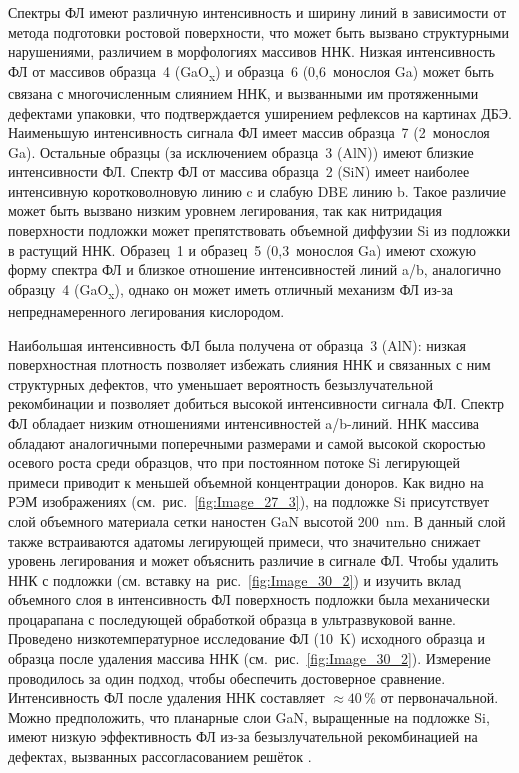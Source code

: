 Спектры ФЛ имеют различную интенсивность и ширину линий в зависимости от метода
подготовки ростовой поверхности, что может быть вызвано структурными
нарушениями, различием в морфологиях массивов ННК. Низкая интенсивность ФЛ от
массивов образца~4 (GaO\textsubscript{x}) и образца~6 (0,6~монослоя Ga) может
быть связана с многочисленным слиянием ННК, и вызванными им протяженными
дефектами упаковки, что подтверждается уширением рефлексов на картинах ДБЭ.
Наименьшую интенсивность сигнала ФЛ имеет массив образца~7 (2~монослоя Ga).
Остальные образцы (за исключением образца~3 (AlN)) имеют близкие интенсивности
ФЛ. Спектр ФЛ от массива образца~2 (SiN) имеет наиболее интенсивную
коротковолновую линию c и слабую DBE линию b. Такое различие может быть вызвано
низким уровнем легирования, так как нитридация поверхности подложки может
препятствовать объемной диффузии Si из подложки в растущий ННК. Образец~1 и
образец~5 (0,3~монослоя Ga) имеют схожую форму спектра ФЛ и близкое отношение
интенсивностей линий a/b, аналогично образцу~4 (GaO\textsubscript{x}), однако
он может иметь отличный механизм ФЛ из-за непреднамеренного легирования
кислородом.

Наибольшая интенсивность ФЛ была получена от образца~3 (AlN): низкая
поверхностная плотность позволяет избежать слияния ННК и связанных с ним
структурных дефектов, что уменьшает вероятность безызлучательной рекомбинации и
позволяет добиться высокой интенсивности сигнала ФЛ. Спектр ФЛ обладает низким
отношениями интенсивностей a/b-линий. ННК массива обладают аналогичными
поперечными размерами и самой высокой скоростью осевого роста среди образцов,
что при постоянном потоке Si легирующей примеси приводит к меньшей объемной
концентрации доноров. Как видно на РЭМ изображениях
(см.~рис.~\cref{fig:Image_27_3}), на подложке Si присутствует слой объемного
материала сетки наностен GaN высотой 200~\si{\nano\meter}. В данный слой также
встраиваются адатомы легирующей примеси, что значительно снижает уровень
легирования и может объяснить различие в сигнале ФЛ. Чтобы удалить ННК с
подложки (см. вставку на~рис.~\cref{fig:Image_30_2}) и изучить вклад объемного
слоя в интенсивность ФЛ поверхность подложки была механически процарапана с
последующей обработкой образца в ультразвуковой ванне. Проведено
низкотемпературное исследование ФЛ (10~\si{\kelvin}) исходного образца и
образца после удаления массива ННК (см.~рис.~\cref{fig:Image_30_2}). Измерение
проводилось за один подход, чтобы обеспечить достоверное сравнение.
Интенсивность ФЛ после удаления ННК составляет \(\approx 40\,\%\) от
первоначальной. Можно предположить, что планарные слои GaN, выращенные на
подложке Si, имеют низкую эффективность ФЛ из-за безызлучательной рекомбинацией
на дефектах, вызванных рассогласованием решёток \cite{Calleja1999,
Reshchikov2005}.


